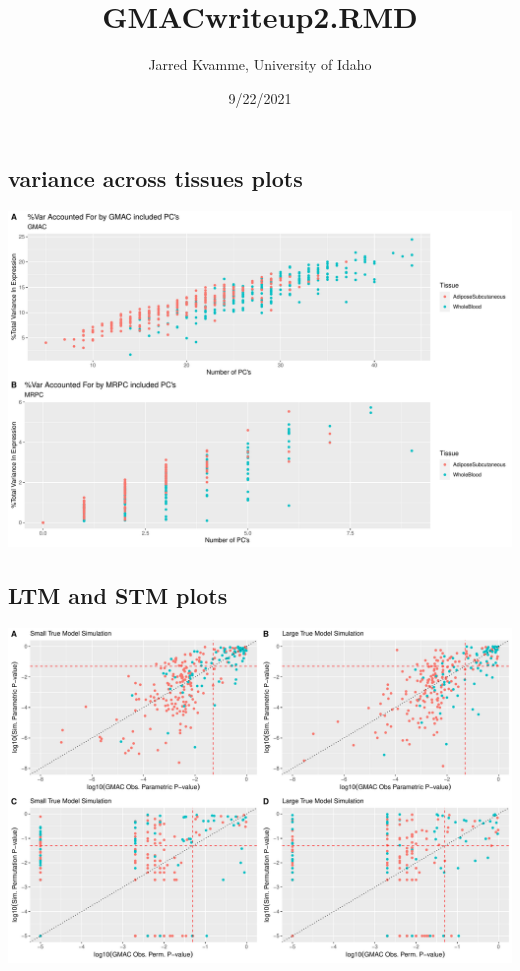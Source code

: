 \documentclass[
]{article}
\title{GMACwriteup2.RMD}
\author{Jarred Kvamme, University of Idaho}
\date{9/22/2021}
\begin{document}
\maketitle

\hypertarget{variance-across-tissues-plots}{%
\subsection{variance across tissues
plots}\label{variance-across-tissues-plots}}

\includegraphics{GMACwriteup2_files/figure-latex/unnamed-chunk-1-1.pdf}

\hypertarget{ltm-and-stm-plots}{%
\subsection{LTM and STM plots}\label{ltm-and-stm-plots}}

\includegraphics{GMACwriteup2_files/figure-latex/unnamed-chunk-2-1.pdf}
\end{document}
